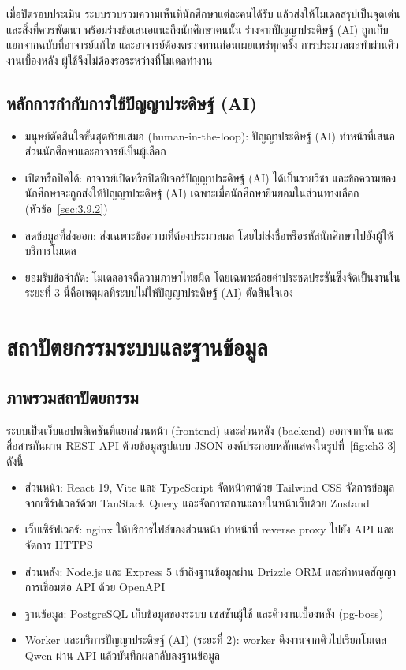 เมื่อปิดรอบประเมิน ระบบรวบรวมความเห็นที่นักศึกษาแต่ละคนได้รับ แล้วส่งให้โมเดลสรุปเป็นจุดเด่นและสิ่งที่ควรพัฒนา พร้อมร่างข้อเสนอแนะถึงนักศึกษาคนนั้น ร่างจากปัญญาประดิษฐ์ (AI) ถูกเก็บแยกจากฉบับที่อาจารย์แก้ไข และอาจารย์ต้องตรวจทานก่อนเผยแพร่ทุกครั้ง การประมวลผลทำผ่านคิวงานเบื้องหลัง ผู้ใช้จึงไม่ต้องรอระหว่างที่โมเดลทำงาน

\subsection{หลักการกำกับการใช้ปัญญาประดิษฐ์ (AI)}\label{sec:3.6.4}

\begin{itemize}
  \item มนุษย์ตัดสินใจขั้นสุดท้ายเสมอ (human-in-the-loop): ปัญญาประดิษฐ์ (AI) ทำหน้าที่เสนอ ส่วนนักศึกษาและอาจารย์เป็นผู้เลือก
  \item เปิดหรือปิดได้: อาจารย์เปิดหรือปิดฟีเจอร์ปัญญาประดิษฐ์ (AI) ได้เป็นรายวิชา และข้อความของนักศึกษาจะถูกส่งให้ปัญญาประดิษฐ์ (AI) เฉพาะเมื่อนักศึกษายินยอมในส่วนทางเลือก (หัวข้อ~\ref{sec:3.9.2})
  \item ลดข้อมูลที่ส่งออก: ส่งเฉพาะข้อความที่ต้องประมวลผล โดยไม่ส่งชื่อหรือรหัสนักศึกษาไปยังผู้ให้บริการโมเดล
  \item ยอมรับข้อจำกัด: โมเดลอาจตีความภาษาไทยผิด โดยเฉพาะถ้อยคำประชดประชันซึ่งจัดเป็นงานในระยะที่ 3 นี่คือเหตุผลที่ระบบไม่ให้ปัญญาประดิษฐ์ (AI) ตัดสินใจเอง
\end{itemize}

\section{สถาปัตยกรรมระบบและฐานข้อมูล}\label{sec:3.7}

\subsection{ภาพรวมสถาปัตยกรรม}\label{sec:3.7.1}

ระบบเป็นเว็บแอปพลิเคชันที่แยกส่วนหน้า (frontend) และส่วนหลัง (backend) ออกจากกัน และสื่อสารกันผ่าน REST API ด้วยข้อมูลรูปแบบ JSON องค์ประกอบหลักแสดงในรูปที่~\ref{fig:ch3-3} ดังนี้

\begin{itemize}
  \item ส่วนหน้า: React 19, Vite และ TypeScript จัดหน้าตาด้วย Tailwind CSS จัดการข้อมูลจากเซิร์ฟเวอร์ด้วย TanStack Query และจัดการสถานะภายในหน้าเว็บด้วย Zustand
  \item เว็บเซิร์ฟเวอร์: nginx ให้บริการไฟล์ของส่วนหน้า ทำหน้าที่ reverse proxy ไปยัง API และจัดการ HTTPS
  \item ส่วนหลัง: Node.js และ Express 5 เข้าถึงฐานข้อมูลผ่าน Drizzle ORM และกำหนดสัญญาการเชื่อมต่อ API ด้วย OpenAPI
  \item ฐานข้อมูล: PostgreSQL เก็บข้อมูลของระบบ เซสชันผู้ใช้ และคิวงานเบื้องหลัง (pg-boss)
  \item Worker และบริการปัญญาประดิษฐ์ (AI) (ระยะที่ 2): worker ดึงงานจากคิวไปเรียกโมเดล Qwen ผ่าน API แล้วบันทึกผลกลับลงฐานข้อมูล
\end{itemize}

